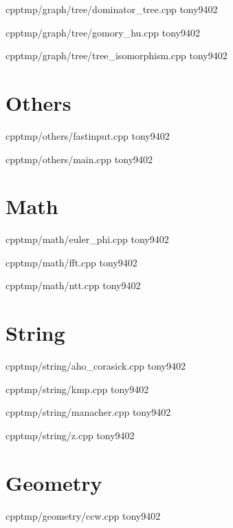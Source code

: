 {}
{}
{}
{cpp}{tmp/graph/tree/dominator_tree.cpp}
{tony9402}



{}
{}
{}
{cpp}{tmp/graph/tree/gomory_hu.cpp}
{tony9402}



{}
{}
{}
{cpp}{tmp/graph/tree/tree_isomorphism.cpp}
{tony9402}


\section{Others}


{}
{}
{}
{cpp}{tmp/others/fastinput.cpp}
{tony9402}



{}
{}
{}
{cpp}{tmp/others/main.cpp}
{tony9402}


\section{Math}


{}
{}
{}
{cpp}{tmp/math/euler_phi.cpp}
{tony9402}



{}
{}
{}
{cpp}{tmp/math/fft.cpp}
{tony9402}



{}
{}
{}
{cpp}{tmp/math/ntt.cpp}
{tony9402}


\section{String}


{}
{}
{}
{cpp}{tmp/string/aho_corasick.cpp}
{tony9402}



{}
{}
{}
{cpp}{tmp/string/kmp.cpp}
{tony9402}



{}
{}
{}
{cpp}{tmp/string/manacher.cpp}
{tony9402}



{}
{}
{}
{cpp}{tmp/string/z.cpp}
{tony9402}


\section{Geometry}


{}
{}
{}
{cpp}{tmp/geometry/ccw.cpp}
{tony9402}
